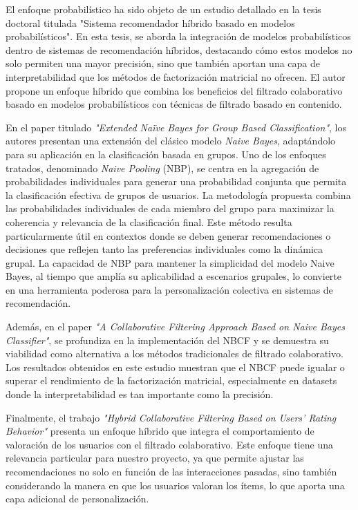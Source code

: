\documentclass[runningheads,a4paper]{llncs}
\begin{document}
El enfoque probabilístico ha sido objeto de un 
estudio detallado en la tesis doctoral titulada 
"Sistema recomendador híbrido basado en modelos 
probabilísticos"\cite{tesis_sistema_recomendador_hibrido}. En esta tesis, se aborda la 
integración de modelos probabilísticos dentro de 
sistemas de recomendación híbridos, destacando cómo 
estos modelos no solo permiten una mayor precisión, 
sino que también aportan una capa de interpretabilidad 
que los métodos de factorización matricial no ofrecen. 
El autor propone un enfoque híbrido que combina los 
beneficios del filtrado colaborativo basado en modelos 
probabilísticos con técnicas de filtrado basado en 
contenido.

En el paper titulado \textit{"Extended Naïve 
Bayes for Group Based Classification"}\cite{nbp}, los autores 
presentan una extensión del clásico modelo 
\textit{Naive Bayes}, adaptándolo para su aplicación 
en la clasificación basada en grupos. Uno de los 
enfoques tratados, 
denominado \textit{Naive Pooling} (NBP), se centra en la 
agregación de probabilidades individuales para 
generar una probabilidad conjunta que permita la 
clasificación efectiva de grupos de usuarios. La 
metodología propuesta combina las probabilidades 
individuales de cada miembro del grupo para maximizar 
la coherencia y relevancia de la clasificación final. 
Este método resulta particularmente útil en contextos 
donde se deben generar recomendaciones o decisiones 
que reflejen tanto las preferencias individuales 
como la dinámica grupal. La capacidad de NBP para 
mantener la simplicidad del modelo Naive Bayes, 
al tiempo que amplía su aplicabilidad a escenarios 
grupales, lo convierte en una herramienta poderosa 
para la personalización colectiva en sistemas de 
recomendación.

Además, en el paper \textit{"A Collaborative Filtering 
Approach Based on Naive Bayes Classifier"}\cite{nbcf}, 
se profundiza en la implementación del NBCF y se 
demuestra su viabilidad como alternativa a los 
métodos tradicionales de filtrado colaborativo. 
Los resultados obtenidos en este estudio muestran 
que el NBCF puede igualar o superar el rendimiento de 
la factorización matricial, especialmente en datasets 
donde la interpretabilidad es tan importante como la 
precisión.

Finalmente, el trabajo \textit{"Hybrid Collaborative Filtering 
Based on Users' Rating Behavior"}\cite{hybrid_collaborative_filtering} presenta un enfoque 
híbrido que integra el comportamiento de valoración 
de los usuarios con el filtrado colaborativo. 
Este enfoque tiene una relevancia particular para 
nuestro proyecto, ya que permite ajustar las 
recomendaciones no solo en función de las 
interacciones pasadas, sino también considerando la 
manera en que los usuarios valoran los ítems, lo que 
aporta una capa adicional de personalización.
\end{document}
